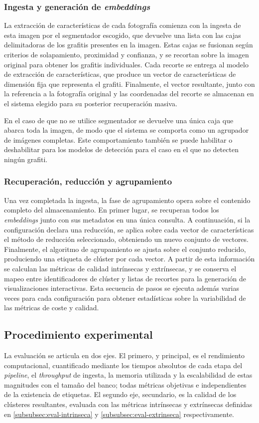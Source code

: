 \subsubsection{Ingesta y generación de \textit{embeddings}}
La extracción de características de cada fotografía comienza con la ingesta de
esta imagen por el segmentador escogido, que devuelve una lista con las cajas
delimitadoras de los grafitis presentes en la imagen. Estas cajas se fusionan
según criterios de solapamiento, proximidad y confianza, y se recortan sobre la
imagen original para obtener los grafitis individuales. Cada recorte se entrega
al modelo de extracción de características, que produce un vector de
características de dimensión fija que representa el grafiti. Finalmente, el
vector resultante, junto con la referencia a la fotografía original y las
coordenadas del recorte se almacenan en el sistema elegido para su posterior
recuperación masiva.

En el caso de que no se utilice segmentador se devuelve una única caja que
abarca toda la imagen, de modo que el sistema se comporta como un agrupador de
imágenes completas. Este comportamiento también se puede habilitar o
deshabilitar para los modelos de detección para el caso en el que no detecten
ningún grafiti.

\subsubsection{Recuperación, reducción y agrupamiento}
Una vez completada la ingesta, la fase de agrupamiento opera sobre el contenido
completo del almacenamiento. En primer lugar, se recuperan todos los
\textit{embeddings} junto con sus metadatos en una única consulta. A
continuación, si la configuración declara una reducción, se aplica sobre cada
vector de características el método de reducción seleccionado, obteniendo un
nuevo conjunto de vectores. Finalmente, el algoritmo de agrupamiento se ajusta
sobre el conjunto reducido, produciendo una etiqueta de clúster por cada
vector. A partir de esta información se calculan las métricas de calidad
intrínsecas y extrínsecas, y se conserva el mapeo entre identificadores de
clúster y listas de recortes para la generación de visualizaciones
interactivas. Esta secuencia de pasos se ejecuta además varias veces para cada
configuración para obtener estadísticas sobre la variabilidad de las métricas
de coste y calidad.

\subsection{Procedimiento experimental}
\label{subsec:experimental}
La evaluación se articula en dos ejes. El primero, y principal, es el
rendimiento computacional, cuantificado mediante los tiempos absolutos de cada
etapa del \textit{pipeline}, el \textit{throughput} de ingesta, la memoria
utilizada y la escalabilidad de estas magnitudes con el tamaño del banco; todas
métricas objetivas e independientes de la existencia de etiquetas. El segundo
eje, secundario, es la calidad de los clústeres resultantes, evaluada con las
métricas intrínsecas y extrínsecas definidas en \ref{subsubsec:eval-intrinseca}
y \ref{subsubsec:eval-extrinseca} respectivamente.


